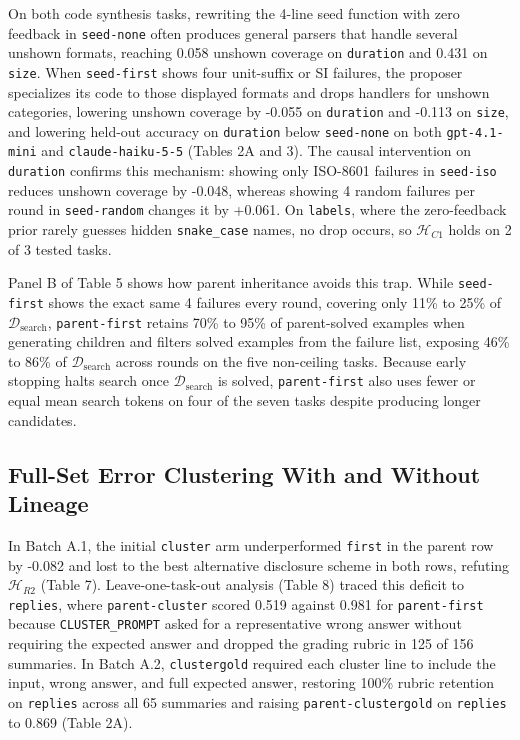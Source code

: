 \documentclass[10pt]{article}
\begin{document}
On both code synthesis tasks, rewriting the 4-line seed function with
zero feedback in \texttt{seed-none} often produces general parsers that
handle several unshown formats, reaching 0.058 unshown coverage on
\texttt{duration} and 0.431 on \texttt{size}. When \texttt{seed-first}
shows four unit-suffix or SI failures, the proposer specializes its code
to those displayed formats and drops handlers for unshown categories,
lowering unshown coverage by -0.055 on \texttt{duration} and -0.113 on
\texttt{size}, and lowering held-out accuracy on \texttt{duration} below
\texttt{seed-none} on both \texttt{gpt-4.1-mini} and
\texttt{claude-haiku-5-5} (Tables 2A and 3). The causal intervention on
\texttt{duration} confirms this mechanism: showing only ISO-8601
failures in \texttt{seed-iso} reduces unshown coverage by -0.048,
whereas showing 4 random failures per round in \texttt{seed-random}
changes it by +0.061. On \texttt{labels}, where the zero-feedback prior
rarely guesses hidden \texttt{snake\_case} names, no drop occurs, so
\(\mathcal{H}_{C1}\) holds on 2 of 3 tested tasks.

Panel B of Table 5 shows how parent inheritance avoids this trap. While
\texttt{seed-first} shows the exact same 4 failures every round,
covering only 11\% to 25\% of \(\mathcal{D}_{\text{search}}\),
\texttt{parent-first} retains 70\% to 95\% of parent-solved examples
when generating children and filters solved examples from the failure
list, exposing 46\% to 86\% of \(\mathcal{D}_{\text{search}}\) across
rounds on the five non-ceiling tasks. Because early stopping halts
search once \(\mathcal{D}_{\text{search}}\) is solved,
\texttt{parent-first} also uses fewer or equal mean search tokens on
four of the seven tasks despite producing longer candidates.

\hypertarget{full-set-error-clustering-with-and-without-lineage}{%
\subsection{Full-Set Error Clustering With and Without
Lineage}\label{full-set-error-clustering-with-and-without-lineage}}

In Batch A.1, the initial \texttt{cluster} arm underperformed
\texttt{first} in the parent row by -0.082 and lost to the best
alternative disclosure scheme in both rows, refuting
\(\mathcal{H}_{R2}\) (Table 7). Leave-one-task-out analysis (Table 8)
traced this deficit to \texttt{replies}, where \texttt{parent-cluster}
scored 0.519 against 0.981 for \texttt{parent-first} because
\texttt{CLUSTER\_PROMPT} asked for a representative wrong answer without
requiring the expected answer and dropped the grading rubric in 125 of
156 summaries. In Batch A.2, \texttt{clustergold} required each cluster
line to include the input, wrong answer, and full expected answer,
restoring 100\% rubric retention on \texttt{replies} across all 65
summaries and raising \texttt{parent-clustergold} on \texttt{replies} to
0.869 (Table 2A).
\end{document}
